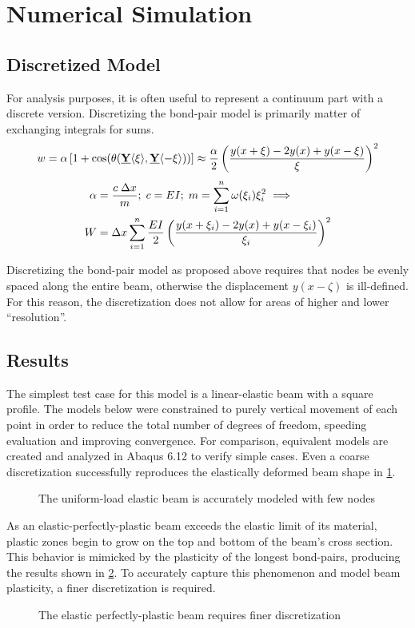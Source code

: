 \documentclass[11pt]{amsart}
\newcommand{\plotpath}{./plots}
\newcommand\vstate[3]{%
	\mathbf{\underline{#1}}%
	\ifstrempty{#2}{}{[#2]}%
	\ifstrempty{#3}{}{\langle #3 \rangle}}
\begin{document}
\section{Numerical Simulation}
\subsection{Discretized Model}
For analysis purposes, it is often useful to represent a continuum part with a discrete version. 
Discretizing the bond-pair model is primarily matter of exchanging integrals for sums. 
%
\begin{align}
w = \alpha \left[1+\cos(\theta(\vstate{Y}{}{\xi},\vstate{Y}{}{\mathbf{-\xi}})) \right] \approx \frac{\alpha}{2}\left(\frac{y(x+\xi)-2y(x)+y(x-\xi)}{\xi}\right)^2 \notag
\end{align}
%
\begin{align}
\label{eq:discretebeam}
\alpha &= \frac{c\; \Delta x}{m} ;\; c= EI ;\; m=\sum_{i=1}^n \omega(\xi_i)\xi_i^2 \implies \nonumber \\
W&=\Delta x \sum_{i=1}^n \frac{EI}{2}\left(\frac{y(x+\xi_i)-2y(x)+y(x-\xi_i)}{\xi_i}\right)^2\notag
\end{align}
%

Discretizing the bond-pair model as proposed above requires that nodes be evenly spaced along the entire beam, otherwise the displacement \(y(x-\zeta)\) is ill-defined. 
For this reason, the discretization does not allow for areas of higher and lower ``resolution''. 
\subsection{Results}
The simplest test case for this model is a linear-elastic beam with a square profile.
The models below were constrained to purely vertical movement of each point in order to reduce the total number of degrees of freedom, speeding evaluation and improving convergence.
For comparison, equivalent models are created and analyzed in Abaqus 6.12 to verify simple cases.
Even a coarse discretization successfully reproduces the elastically deformed beam shape in \cref{fig:eppt_g100}.

\begin{figure}[h]
  \centering
  \scalebox{.55}{}
  \caption{The uniform-load elastic beam is accurately modeled with few nodes}
  \label{fig:eppt_g100}
\end{figure}

As an elastic-perfectly-plastic beam exceeds the elastic limit of its material, plastic zones begin to grow on the top and bottom of the beam's cross section.
This behavior is mimicked by the plasticity of the longest bond-pairs, producing the results shown in \cref{fig:eppu_h10_g2000}.
To accurately capture this phenomenon and model beam plasticity, a finer discretization is required.
\begin{figure}[h]
  \centering
  \scalebox{.55}{}
  \caption{The elastic perfectly-plastic beam requires finer discretization}
  \label{fig:eppu_h10_g2000}
\end{figure}
\end{document}
